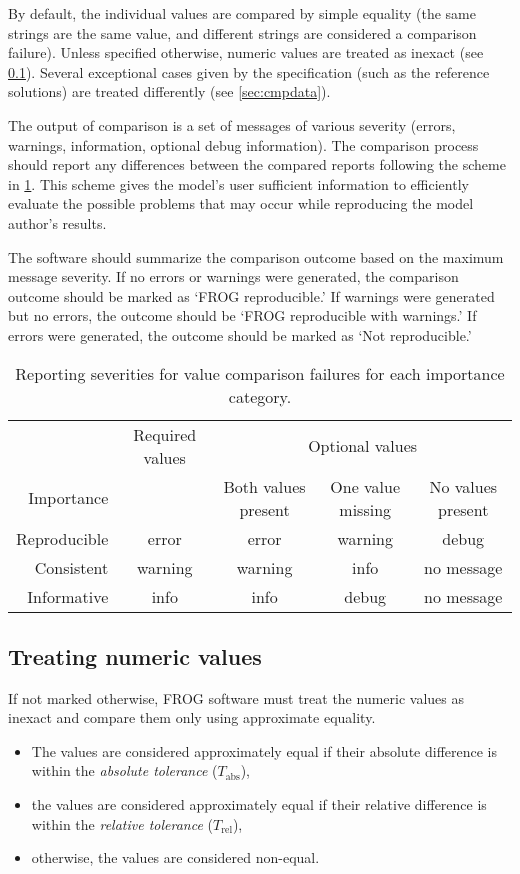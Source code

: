 By default, the individual values are compared by simple equality (the same strings are the same value, and different strings are considered a comparison failure).
Unless specified otherwise, numeric values are treated as inexact (see \cref{sec:inexact}).
Several exceptional cases given by the specification (such as the reference solutions) are treated differently (see \cref{sec:cmpdata}).

The output of comparison is a set of messages of various severity (errors, warnings, information, optional debug information).
The comparison process should report any differences between the compared reports following the scheme in \cref{tab:importance}.
This scheme gives the model's user sufficient information to efficiently evaluate the possible problems that may occur while reproducing the model author's results.

The software should summarize the comparison outcome based on the maximum message severity. If no errors or warnings were generated, the comparison outcome should be marked as `FROG reproducible.' If warnings were generated but no errors, the outcome should be `FROG reproducible with warnings.'
If errors were generated, the outcome should be marked as `Not reproducible.'

\begin{table}\tablefont
\begin{tabular}{rcccc}
\toprule
 & Required values & \multicolumn{3}{c}{Optional values} \\ \cmidrule(rl){3-5}
Importance & & Both values present & One value missing & No values present \\
\midrule
Reproducible & error   & error   & warning & debug      \\
Consistent   & warning & warning & info    & no message \\
Informative  & info    & info    & debug   & no message \\
\bottomrule
\end{tabular}
\caption[Comparison failure reporting levels]{Reporting severities for value comparison failures for each importance category.}
\label{tab:importance}
\end{table}

\subsection{Treating numeric values}
\label{sec:inexact}

If not marked otherwise, FROG software must treat the numeric values as inexact and compare them only using approximate equality.
\begin{itemize}
\item The values are considered approximately equal if their absolute difference is within the \emph{absolute tolerance} ($T_\text{abs}$),
\item the values are considered approximately equal if their relative difference is within the \emph{relative tolerance} ($T_\text{rel}$),
\item otherwise, the values are considered non-equal.
\end{itemize}

